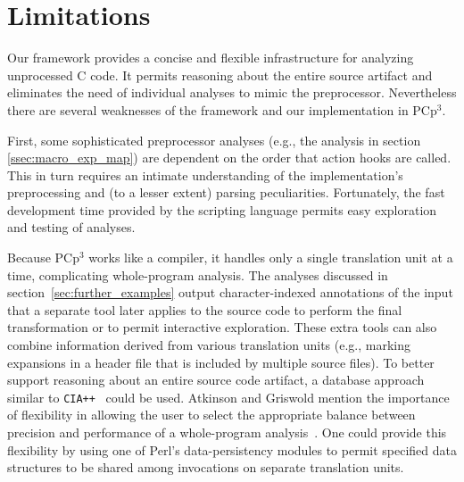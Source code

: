\documentclass{article}
\newcommand{\pcp}{\mbox{\textsf{PCp}$^3$}}
\newcommand{\Perl}{\mbox{Perl}}
\newcommand{\C}{\mbox{C}}
\newcommand{\eg}{e.g.,}
\begin{document}
\section{Limitations}
\label{sec:limitations}




Our framework provides a concise and flexible infrastructure for analyzing
unprocessed \C{} code. It permits reasoning about the entire source
artifact and eliminates the need of individual analyses to mimic the
preprocessor.  Nevertheless there are several weaknesses of the
framework and our implementation in \pcp{}.

First, some sophisticated preprocessor analyses (\eg{} the 
analysis in section \ref{ssec:macro_exp_map}) are dependent on the order that
action hooks are called.  This in turn requires an intimate
understanding of the implementation's preprocessing and (to a lesser
extent) parsing
peculiarities.  Fortunately, the fast development time provided by the
scripting language permits easy exploration and testing of analyses.

Because \pcp{} works like a compiler, it handles only a single
translation unit at a time, complicating whole-program analysis.  The
analyses discussed in section~\ref{sec:further_examples} output
character-indexed annotations of the input that a separate tool later
applies to the source code to perform the final transformation or to permit
interactive exploration.  These extra tools can also combine
information derived from various translation units (\eg{} marking
expansions in a header file that is included by multiple source files).
To better support reasoning about an entire source code artifact, a
database approach similar to \texttt{CIA++}~\cite{CIA++90} could be
used.  Atkinson and Griswold mention the importance of flexibility in
allowing the user to select the appropriate balance between precision
and performance of a whole-program analysis~\cite{Atkinson96}.  One
could provide this flexibility by using one of \Perl{}'s
data-persistency modules to permit specified data structures to be shared among
invocations on separate translation units.
\end{document}
